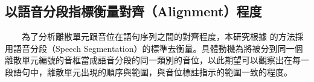 \subsection{以語音分段指標衡量對齊（Alignment）程度}

　　為了分析離散單元跟音位在語句序列之間的對齊程度，本研究根據 \cite{strgar_phoneme_2023} 的方法採用語音分段（Speech Segmentation）的標準去衡量。具體動機為將被分到同一個離散單元編號的音框當成語音分段的同一類別的音位，以此期望可以觀察出在每一段語句中，離散單元出現的順序與範圍，與音位標註指示的範圍一致的程度。

